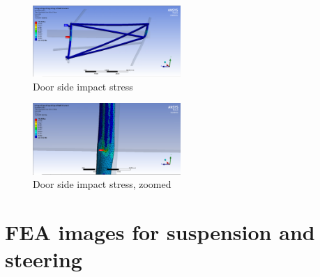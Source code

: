 \documentclass[10pt]{article}
\begin{document}
\begin{figure}[H]
\centering
\includegraphics[width=0.5\textwidth]{figures/fea/chassis/door-stress}
\caption{Door side impact stress}
\label{fig:door-stress}
\end{figure}

\begin{figure}[H]
\centering
\includegraphics[width=0.5\textwidth]{figures/fea/chassis/door-stress-zoom}
\caption{Door side impact stress, zoomed}
\label{fig:door-stress-zoom}
\end{figure}

\clearpage
\section{FEA images for suspension and steering}
\label{sec:fea-parts-images}
\end{document}
